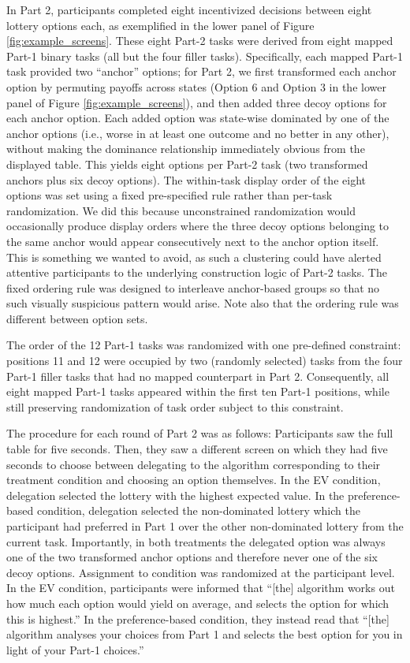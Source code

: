 \documentclass[a4paper, 12pt, fleqn]{article}
\theoremstyle{definition}
\begin{document}
In Part 2, participants completed eight incentivized decisions between eight lottery options each, as exemplified in the lower panel of Figure \ref{fig:example_screens}. These eight Part-2 tasks were derived from eight mapped Part-1 binary tasks (all but the four filler tasks). Specifically, each mapped Part-1 task provided two ``anchor'' options; for Part 2, we first transformed each anchor option by permuting payoffs across states (Option 6 and Option 3 in the lower panel of Figure \ref{fig:example_screens}), and then added three decoy options for each anchor option. Each added option was state-wise dominated by one of the anchor options (i.e., worse in at least one outcome and no better in any other), without making the dominance relationship immediately obvious from the displayed table. This yields eight options per Part-2 task (two transformed anchors plus six decoy options). The within-task display order of the eight options was set using a fixed pre-specified rule rather than per-task randomization. We did this because unconstrained randomization would occasionally produce display orders where the three decoy options belonging to the same anchor would appear consecutively next to the anchor option itself. This is something we wanted to avoid, as such a clustering could have alerted attentive participants to the underlying construction logic of Part-2 tasks. The fixed ordering rule was designed to interleave anchor-based groups so that no such visually suspicious pattern would arise. Note also that  the ordering rule was different between option sets.

The order of the 12 Part-1 tasks was randomized with one pre-defined constraint: positions 11 and 12 were occupied by two (randomly selected) tasks from the four Part-1 filler tasks that had no mapped counterpart in Part 2. Consequently, all eight mapped Part-1 tasks appeared within the first ten Part-1 positions, while still preserving randomization of task order subject to this constraint.

The procedure for each round of Part 2 was as follows: Participants saw the full table for five seconds. Then, they saw a different screen on which they had five seconds to choose between delegating to the algorithm corresponding to their treatment condition and choosing an option themselves.
In the EV condition, delegation selected the lottery with the highest expected value. In the preference-based condition, delegation selected the non-dominated lottery which the participant had preferred in Part 1 over the other non-dominated lottery from the current task. Importantly, in both treatments the delegated option was always one of the two transformed anchor options and therefore never one of the six decoy options. Assignment to condition was randomized at the participant level. In the EV condition, participants were informed that ``[the] algorithm works out how much each option would yield on average, and selects the option for which this is highest.'' In the preference-based condition, they instead read that ``[the] algorithm analyses your choices from Part 1 and selects the best option for you in light of your Part-1 choices.''
\end{document}
